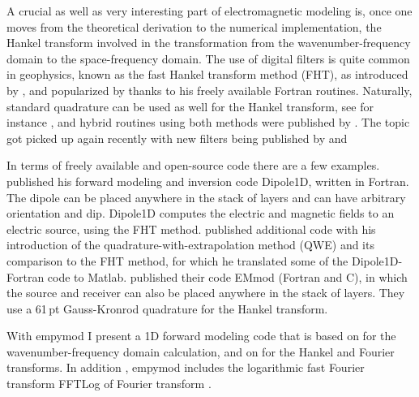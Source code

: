 \documentclass[manuscript,revised]{geophysics}
\begin{document}
A crucial as well as very interesting part of electromagnetic modeling is,
once one moves from the theoretical derivation to the numerical implementation,
the Hankel transform involved in the transformation from the
wave\-num\-ber-fre\-que\-ncy domain to the space-frequency domain. 
 The use of digital filters is quite
common in geophysics, known as the fast Hankel transform method (FHT), as
introduced by \cite{GP.71.Gosh}, and popularized by \cite{TRP.75.Anderson,
GEO.79.Anderson, TMS.82.Anderson} thanks to his freely available Fortran
routines. Naturally, standard quadrature can be used as well for the Hankel
transform, see for instance \cite{GEO.83.Chave}, and hybrid routines using both
methods were published by \cite{GEO.84.Anderson, GEO.89.Anderson}. The topic
got picked up again recently with new filters being published by
\cite{GP.07.Kong} and \cite{GEO.09.Key, GEO.12.Key}

In terms of freely available and open-source code there are a few examples.
\cite{GEO.09.Key} published his forward modeling and inversion code Dipole1D,
written in Fortran. The dipole can be placed anywhere in the stack of layers
and can have arbitrary orientation and dip. Dipole1D computes the electric and
magnetic fields to an electric source, using the FHT method. \cite{GEO.12.Key}
published additional code with his introduction of the
qua\-dra\-ture-with-ex\-tra\-po\-la\-tion method (QWE) and its comparison to
the FHT method, for which he translated some of the Dipole1D-Fortran code to
Matlab. \cite{GEO.15.Hunziker} published their code EMmod (Fortran and C),
in which the source and receiver can also be placed anywhere in the stack of
layers. They use a 61\,pt Gauss-Kronrod quadrature for the Hankel transform.

With empymod I present a 1D forward modeling code that is based on
\cite{GEO.15.Hunziker} for the wavenumber-frequency domain calculation, and
 on \cite{GEO.12.Key} for the Hankel and Fourier transforms.
In addition , empymod includes  the logarithmic fast Fourier transform
FFTLog of \cite{RAS.00.Hamilton}   Fourier
transform .
\end{document}
